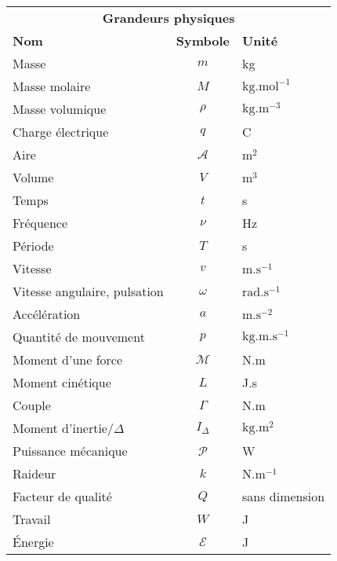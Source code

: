 \begin{center}
    \begin{tabular}{@{} p{6cm}cl @{}} %
       \toprule	  
       \multicolumn{3}{c}{\textbf{Grandeurs physiques}}  \\
       \cmidrule(r){1-3}
       \textbf{Nom}				& \textbf{Symbole}					& \textbf{Unité}\\
       \midrule
       Masse						& $m$								& kg\\
       Masse molaire				& $M$								& $\mathrm{kg.mol^{-1}}$\\
       Masse volumique 			& $\rho$							& $\mathrm{kg.m^{-3}}$\\
       Charge électrique			& $q$								& C\\
       Aire						& $\mathcal{A}$						& $\mathrm{m^{2}}$\\
       Volume					& $V$								& $\mathrm{m^{3}}$\\
       Temps						& $t$								& s\\
       Fréquence					& $\nu$								& Hz\\
       Période					& $T$								& s\\
       Vitesse			 		& $v$								& $\mathrm{m.s^{-1}}$\\
       Vitesse angulaire, pulsation	& $\omega$						& $\mathrm{rad.s^{-1}}$\\
       Accélération			 	& $a$							 	& $\mathrm{m.s^{-2}}$\\
       Quantité de mouvement		& $p$								& $\mathrm{kg.m.s^{-1}}$\\
       Moment d'une force		& $\mathcal{M}$						& N.m\\
       Moment cinétique 			& $L$								& J.s\\
       Couple 					& $\Gamma$							& N.m\\
 	  Moment d'inertie/\(\Delta\)& $I_\Delta$								& $\mathrm{kg.m^2}$\\
       Puissance mécanique		& $\mathcal{P}$						& W \\
       Raideur					& $k$									& $\mathrm{N.m^{-1}}$\\
 	  Facteur de qualité		& $Q$									& sans dimension\\
       Travail					& $W$									&J\\
 	  Énergie 					& $\mathcal{E}$							& J\\
 	  \bottomrule
    \end{tabular}
\end{center}

